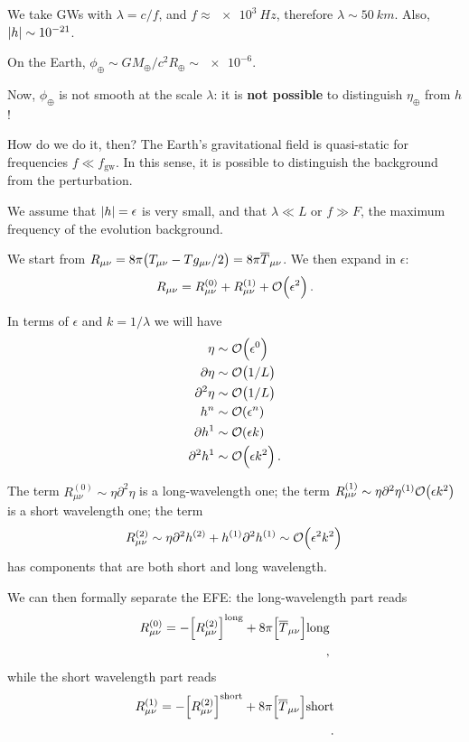\documentclass[main.tex]{subfiles}
\begin{document}
We take GWs with \(\lambda = c/f\), and \(f \approx \SI{e3}{Hz}\), therefore \(\lambda \sim \SI{50}{km}\). Also, \(\abs{h} \sim \num{e-21}\).

On the Earth, \( \phi _{\oplus} \sim G M _{\oplus} / c^2 R_{\oplus} \sim \num{e-6}\). 

Now, \(\phi _{\oplus}\) is not smooth at the scale \(\lambda \): it is \textbf{not possible} to distinguish \(\eta _\oplus\) from \(h\)!

How do we do it, then? 
The Earth's gravitational field is quasi-static for frequencies \(f \ll f_{\text{gw}}\). 
In this sense, it is possible to distinguish the background from the perturbation. 

We assume that \(\abs{h} = \epsilon \) is very small, and that \(\lambda \ll L\) or \(f \gg F\), the maximum frequency of the evolution background. 

We start from \(R_{\mu \nu } = 8 \pi \qty(T_{\mu \nu } - T g_{\mu \nu } /2) = 8 \pi \overline{T}_{\mu \nu }\). We then expand in \(\epsilon \):
%
\begin{align}
R_{\mu \nu } = 
R_{\mu \nu  }^{(0)}+
R_{\mu \nu  }^{(1)}+
\order{\epsilon^2}
\,.
\end{align}
%

In terms of \(\epsilon \) and \(k = 1 / \lambda \) we will have 
%
\begin{align}
\eta &\sim \order{\epsilon^{0}}  \\
\partial \eta &\sim \order{1/L}   \\
\partial^2 \eta &\sim \order{1/L}  \\
h^{n} &\sim \order{\epsilon^n} \\
\partial h^{1} &\sim \order{\epsilon k} \\
\partial^2 h^{1} &\sim \order{\epsilon k^2} 
\,.
\end{align}

The term \(R^{(0)}_{\mu \nu } \sim \eta \partial^2 \eta \) is a long-wavelength one; the term \(R^{(1)}_{\mu \nu } \sim \eta \partial^2 \eta^{(1)} \order{\epsilon k^2}\) is a short wavelength one; the term 
%
\begin{align}
R^{(2)}_{\mu \nu } \sim \eta \partial^2 h^{(2)} + h^{(1)} \partial^2 h^{(1)} \sim \order{\epsilon^2 k^2}
\,
\end{align}
%
has components that are both short and long wavelength. 

We can then formally separate the EFE: the long-wavelength part reads 
%
\begin{align}
R^{(0)}_{\mu \nu } = - \qty[ R^{(2)}_{\mu \nu }]^{\text{long}}
+ 8 \pi \qty[\overline{T}_{\mu \nu }]\text{long} \\ 
\,,
\end{align}
%
while the short wavelength part reads 
%
\begin{align}
R^{(1)}_{\mu \nu } = - \qty[ R^{(2)}_{\mu \nu }]^{\text{short}}
+ 8 \pi \qty[\overline{T}_{\mu \nu }]\text{short} \\ 
\,.
\end{align}
\end{document}
